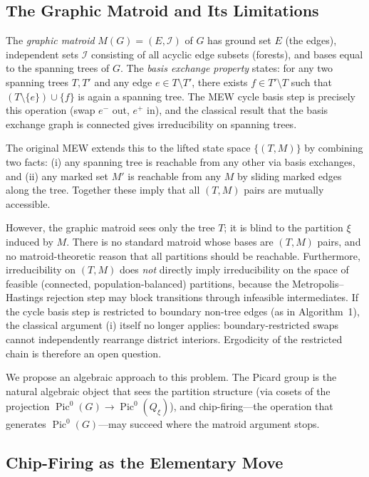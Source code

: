 \documentclass[11pt]{article}
\newcommand{\Pic}{\operatorname{Pic}^0}
\begin{document}
\subsection{The Graphic Matroid and Its Limitations}

The \emph{graphic matroid} $M(G) = (E, \mathcal{I})$ of $G$ has ground set $E$
(the edges), independent sets $\mathcal{I}$ consisting of all acyclic edge
subsets (forests), and bases equal to the spanning trees of $G$. The
\emph{basis exchange property} states: for any two spanning trees $T, T'$ and
any edge $e \in T \setminus T'$, there exists $f \in T' \setminus T$ such that
$(T \setminus \{e\}) \cup \{f\}$ is again a spanning tree. The MEW cycle basis
step is precisely this operation (swap $e^-$ out, $e^+$ in), and the classical
result that the basis exchange graph is connected gives irreducibility on
spanning trees.

The original MEW extends this to the lifted state space $\{(T, M)\}$ by
combining two facts: (i) any spanning tree is reachable from any other via
basis exchanges, and (ii) any marked set $M'$ is reachable from any $M$ by
sliding marked edges along the tree. Together these imply that all $(T, M)$
pairs are mutually accessible.

However, the graphic matroid sees only the tree $T$; it is blind to the
partition $\xi$ induced by $M$. There is no standard matroid whose bases are
$(T, M)$ pairs, and no matroid-theoretic reason that all partitions should be
reachable. Furthermore, irreducibility on $(T, M)$ does \emph{not} directly
imply irreducibility on the space of feasible (connected, population-balanced)
partitions, because the Metropolis--Hastings rejection step may block
transitions through infeasible intermediates. If the cycle basis step is
restricted to boundary non-tree edges (as in Algorithm~1), the classical
argument (i) itself no longer applies: boundary-restricted swaps cannot
independently rearrange district interiors. Ergodicity of the restricted chain
is therefore an open question.

We propose an algebraic approach to this problem. The Picard group is the
natural algebraic object that sees the partition structure (via cosets of the
projection $\Pic(G) \to \Pic(Q_{\xi})$), and chip-firing---the operation that
generates $\Pic(G)$---may succeed where the matroid argument stops.

\subsection{Chip-Firing as the Elementary Move}
\end{document}

